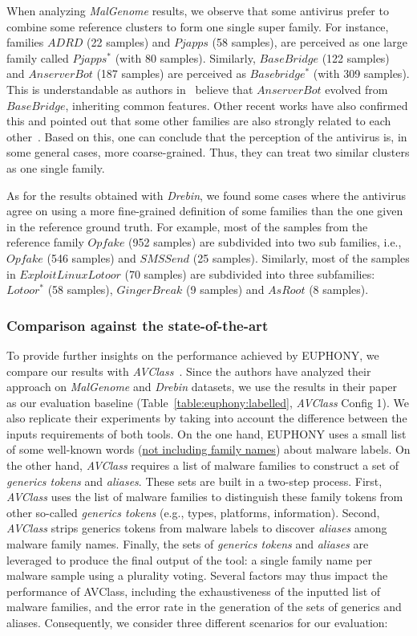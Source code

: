 

When analyzing {\em MalGenome} results, we observe that some antivirus prefer to combine some reference clusters to form one single super family.
For instance, families $ADRD$ (22 samples) and $Pjapps$ (58 samples), are perceived as one large family called $Pjapps^*$ (with 80 samples).
Similarly, $BaseBridge$ (122 samples) and $AnserverBot$ (187 samples) are perceived as $Basebridge^*$ (with 309 samples).
This is understandable as authors in~\cite{zhou_dissecting_2012} believe that $AnserverBot$ evolved from $BaseBridge$, inheriting common features.
Other recent works have also confirmed this and pointed out that some other families are also strongly related to each other~\cite{suarez-tangil_dendroid:_2014}.
Based on this, one can conclude that the perception of the antivirus is, in some general cases, more coarse-grained.
Thus, they can treat two similar clusters as one single family.

As for the results obtained with {\em Drebin}, we found some cases where the antivirus agree on using a more fine-grained definition of some families than the one given in the reference ground truth.
For example, most of the samples from the reference family $Opfake$ (952 samples) are subdivided into two sub families, i.e., $Opfake$ (546 samples) and $SMSSend$ (25 samples).
Similarly, most of the samples in $ExploitLinuxLotoor$ (70 samples) are subdivided into three subfamilies: $Lotoor^*$ (58 samples), $GingerBreak$ (9 samples) and $AsRoot$ (8 samples).
\subsubsection*{Comparison against the state-of-the-art}
To provide further insights on the performance achieved by EUPHONY, we compare our results with {\em AVClass}~\cite{monrose_avclass:_2016}.
Since the authors have analyzed their approach on {\em MalGenome} and {\em Drebin} datasets, we use the results in their paper as our evaluation baseline (Table~\ref{table:euphony:labelled}, {\em AVClass} Config 1).
We also replicate their experiments by taking into account the difference between the inputs requirements of both tools.
On the one hand, EUPHONY uses a small list of some well-known words (\underline{not including family names}) about malware labels.
On the other hand, {\em AVClass } requires a list of malware families to construct a set of \textit{generics tokens} and \textit{aliases}.
These sets are built in a two-step process.
First, {\em AVClass } uses the list of malware families to distinguish these family tokens from other so-called \textit{generics tokens} (e.g.,
types, platforms, information).
Second, {\em AVClass} strips generics tokens from malware labels to discover \textit{aliases} among malware family names.
Finally, the sets of \textit{generics tokens} and \textit{aliases} are leveraged to produce the final output of the tool: a single family name per malware sample using a plurality voting.
Several factors may thus impact the performance of AVClass, including the exhaustiveness of the inputted list of malware families, and the error rate in the generation of the sets of generics and aliases.
Consequently, we consider three different scenarios for our evaluation:

